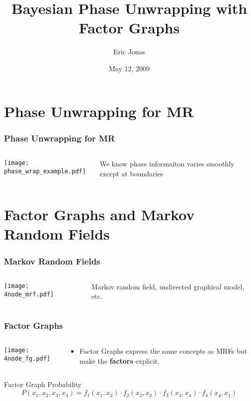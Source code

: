 \documentclass{beamer}
\title{Bayesian Phase Unwrapping with Factor Graphs}
\author{Eric Jonas}
\date{May 12, 2009}
\institute[6.556]{6.556 Final Project}
\begin{document}
\begin{frame}
\maketitle
\end{frame}

\section{Phase Unwrapping for MR}
\begin{frame}
  \frametitle{Phase Unwrapping for MR} 
    \begin{columns}[t]
    \begin{column}{7cm}
      \texttt{[image: phase\_wrap\_example.pdf]}

    \end{column}
    \begin{column}{5cm}
      We know phase informaiton varies smoothly except at boundaries
    \end{column}
  \end{columns}

\end{frame}

\section{Factor Graphs and Markov Random Fields}
\begin{frame}
  \frametitle{Markov Random Fields}
  \begin{columns}
    \begin{column}{5cm}
      \texttt{[image: 4node\_mrf.pdf]}
    \end{column}
    \begin{column}{5cm}
      Markov random field, undirected graphical model, etc. 
    \end{column}
  \end{columns}
\end{frame}

\begin{frame}
  \frametitle{Factor Graphs}
  \begin{columns}
    \begin{column}{5cm}
      \texttt{[image: 4node\_fg.pdf]}
    \end{column}
    \begin{column}{5cm}
      \begin{itemize}
        \item Factor Graphs \cite{kschischang_factor_2001} express the same concepts
          as MRFs but make the \textbf{factors} explicit. 
        \end{itemize}
    \end{column}
  \end{columns}
  \begin{block}{Factor Graph Probability}
    \begin{equation}
      P(x_1, x_2, x_3, x_4) = f_1(x_1, x_2) \cdot f_2(x_2, x_3) \cdot f_3(x_3, x_4) \cdot f_4(x_4, x_1)
    \end{equation}
  \end{block}
\end{frame}
\end{document}
